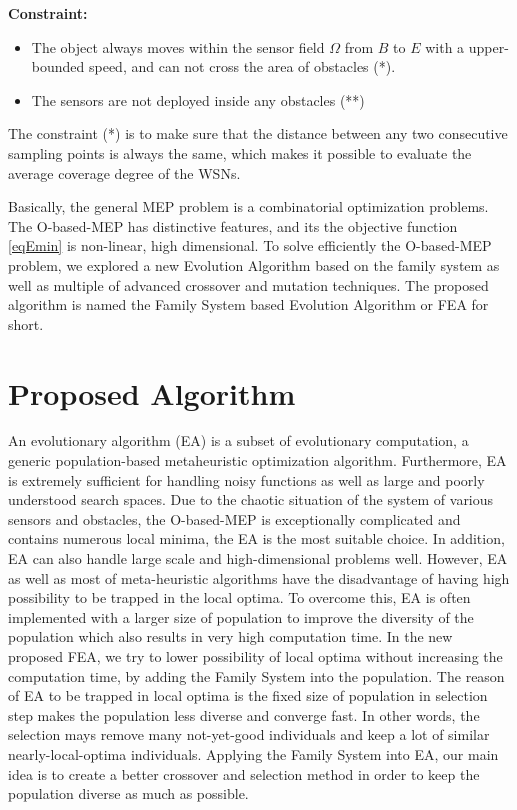 \documentclass[final]{elsarticle}
\begin{document}
\textbf{Constraint:}	
\begin{itemize}
	\item The object always moves within the sensor field $\Omega $ from $B$ to $E$ with a upper-bounded speed, and can not cross the area of obstacles (*).
	\item The sensors are not deployed inside any obstacles (**)
\end{itemize}
The constraint (*) is to make sure that the distance between any two consecutive sampling points is always the same, which makes it possible to evaluate the average coverage degree of the WSNs.
	
Basically, the general MEP problem is a combinatorial optimization problems. The O-based-MEP has distinctive features, and its the objective function \eqref{eqEmin} is non-linear, high dimensional. To solve efficiently the O-based-MEP problem, we explored a new Evolution Algorithm based on the family system as well as multiple of advanced crossover and mutation techniques. The proposed algorithm is named the Family System based Evolution Algorithm or FEA for short.
\section{Proposed Algorithm}
An evolutionary algorithm (EA) is a subset of evolutionary computation, a generic population-based metaheuristic optimization algorithm. Furthermore, EA is extremely sufficient for handling noisy functions as well as large and poorly understood search spaces. Due to the chaotic situation of the system of various sensors and obstacles, the O-based-MEP is exceptionally complicated and contains numerous local minima, the EA is the most suitable choice. In addition, EA can also handle large scale and high-dimensional problems well. However, EA as well as most of meta-heuristic algorithms have the disadvantage of having high possibility to be trapped in the local optima. To overcome this, EA is often implemented with a larger size of population to improve the diversity of the population which also results in very high computation time. In the new proposed FEA, we try to lower possibility of local optima without increasing the computation time, by adding the Family System into the population. The reason of EA to be trapped in local optima is the fixed size of population in selection step makes the population less diverse and converge fast. In other words, the selection mays remove many not-yet-good individuals and keep a lot of similar nearly-local-optima individuals. Applying the Family System into EA, our main idea is to create a better crossover and selection method in order to keep the population diverse as much as possible.
\end{document}
